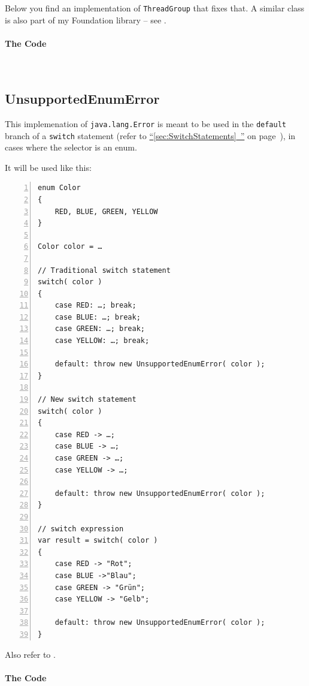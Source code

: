 \documentclass[11pt,a4paper, titlepage, parskip=half, headsepline, footsepline, cleardoublepage=current, headheight=1cm]{scrbook}
\newcommand*{\tqfullvref}[1]{\hyperref[{#1}]{“\ref*{#1}~\nameref*{#1}”} on page~\pageref{#1}}
\begin{document}
Below you find an implementation of \lstinline|ThreadGroup| that fixes that. A similar class is also part of my Foundation library – see \autocite{TQUADRAT_ORG_FOUNDATION_BASE, TQUADRAT_ORG_FOUNDATION_THREADGROUP}.

\paragraph{The Code} \


\subsection{UnsupportedEnumError}\label{sec:UnsupportedEnumError}
This implemenation of \lstinline|java.lang.Error| is meant to be used in the \lstinline|default| branch of a \lstinline|switch| statement (refer to \tqfullvref{sec:SwitchStatements}), in cases where the selector is an enum.

It will be used like this:
\begin{lstlisting}[numbers=left]
enum Color
{
    RED, BLUE, GREEN, YELLOW
}

Color color = …    

// Traditional switch statement
switch( color )
{
    case RED: …; break;
    case BLUE: …; break;
    case GREEN: …; break;
    case YELLOW: …; break;

    default: throw new UnsupportedEnumError( color );
}

// New switch statement
switch( color )
{
    case RED -> …;
    case BLUE -> …;
    case GREEN -> …;
    case YELLOW -> …;

    default: throw new UnsupportedEnumError( color );
}

// switch expression
var result = switch( color )
{
    case RED -> "Rot";
    case BLUE ->"Blau";
    case GREEN -> "Grün";
    case YELLOW -> "Gelb";

    default: throw new UnsupportedEnumError( color );
}
\end{lstlisting}

Also refer to \autocite{TQUADRAT_ORG_FOUNDATION_UNSUPPORTEDENUMERROR}.

\paragraph{The Code} \


\listoftables

\lstlistoflistings

\begin{FlushLeft}
\printbibliography
\end{FlushLeft}

\printindex
\end{document}

